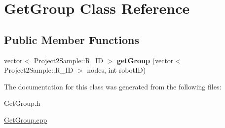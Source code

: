 \hypertarget{classGetGroup}{
\section{GetGroup Class Reference}
\label{classGetGroup}
}
\subsection*{Public Member Functions}
\begin{DoxyCompactItemize}
\item 
\hypertarget{classGetGroup_aff192f42d3789993676d4be1acf1e6e4}{
vector$<$ Project2Sample::R\_\-ID $>$ {\bfseries getGroup} (vector$<$ Project2Sample::R\_\-ID $>$ nodes, int robotID)}
\label{classGetGroup_aff192f42d3789993676d4be1acf1e6e4}

\end{DoxyCompactItemize}


The documentation for this class was generated from the following files:\begin{DoxyCompactItemize}
\item 
GetGroup.h\item 
\hyperlink{GetGroup_8cpp}{GetGroup.cpp}\end{DoxyCompactItemize}
